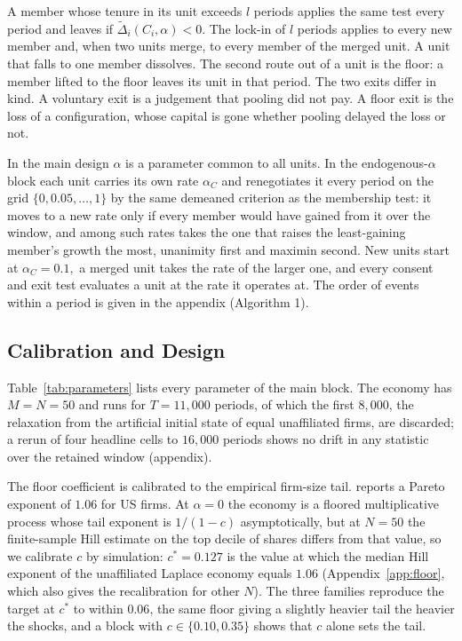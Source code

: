 \documentclass[12pt,a4paper]{article}
\begin{document}
A member whose tenure in its unit exceeds $l$ periods applies the same test every period and leaves if $\tilde{\Delta}_i(C_i, \alpha) < 0$. The lock-in of $l$ periods applies to every new member and, when two units merge, to every member of the merged unit. A unit that falls to one member dissolves. The second route out of a unit is the floor: a member lifted to the floor leaves its unit in that period. The two exits differ in kind. A voluntary exit is a judgement that pooling did not pay. A floor exit is the loss of a configuration, whose capital is gone whether pooling delayed the loss or not. 

In the main design $\alpha$ is a parameter common to all units. In the endogenous-$\alpha$ block each unit carries its own rate $\alpha_C$ and renegotiates it every period on the grid $\{0, 0.05, \ldots, 1\}$ by the same demeaned criterion as the membership test: it moves to a new rate only if every member would have gained from it over the window, and among such rates takes the one that raises the least-gaining member's growth the most, unanimity first and maximin second. New units start at $\alpha_C = 0.1,$ a merged unit takes the rate of the larger one, and every consent and exit test evaluates a unit at the rate it operates at. The order of events within a period is given in the appendix (Algorithm 1). 

\subsection{Calibration and Design\label{sec:calibration}}

Table~\ref{tab:parameters} lists every parameter of the main block. The economy has $M = N = 50$ and runs for $T = 11,000$ periods, of which the first $8,000$, the relaxation from the artificial initial state of equal unaffiliated firms, are discarded; a rerun of four headline cells to $16,000$ periods shows no drift in any statistic over the retained window (appendix).

The floor coefficient is calibrated to the empirical firm-size tail. \textcite{axtell2001zipf} reports a Pareto exponent of $1.06$ for US firms. At $\alpha = 0$ the economy is a floored multiplicative process whose tail exponent is $1/(1 - c)$ asymptotically, but at $N = 50$ the finite-sample Hill estimate \parencite{hill1975simple} on the top decile of shares differs from that value, so we calibrate $c$ by simulation: $c^* = 0.127$ is the value at which the median Hill exponent of the unaffiliated Laplace economy equals $1.06$ (Appendix~\ref{app:floor}, which also gives the recalibration for other $N$). The three families reproduce the target at $c^*$ to within $0.06$, the same floor giving a slightly heavier tail the heavier the shocks, and a block with $c \in \{0.10, 0.35\}$ shows that $c$ alone sets the tail.
\end{document}
